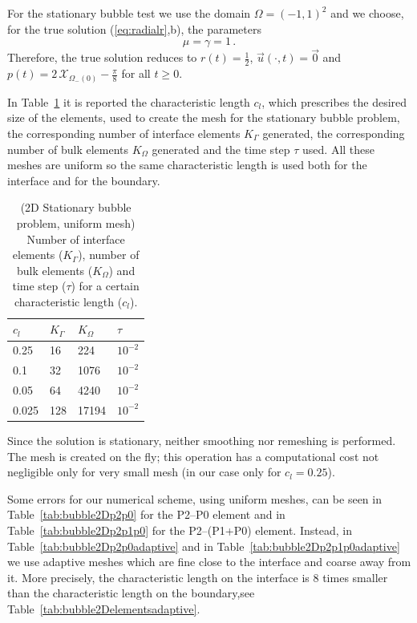 \documentclass[a4paper,12pt,onecolumn]{article}
\newcommand{\bigchi}{\ensuremath{\mathrm{\mathcal{X}}}}
\newcommand{\charfcn}[1]{\bigchi_{#1}} %
\begin{document}
For the stationary bubble test we use the domain $\Omega = (-1,1)^2$ and we choose, for the true solution (\ref{eq:radialr},b), the parameters
\begin{equation*}
\mu = \gamma = 1\,. 
\end{equation*}
Therefore, the true solution reduces to $r(t) = \frac{1}{2}$, $\vec u(\cdot, t) = \vec 0$ and $p(t) = 2\,\charfcn{\Omega_-(0)} - \frac{\pi}{8}$ for all $t \geq 0$.

In Table~\ref{tab:bubble2Delementsuniform} it is reported the characteristic length $c_l$, which prescribes the desired size of the elements, used to create the mesh for the stationary bubble problem, the corresponding number of interface elements $K_\Gamma$ generated, the corresponding number of bulk elements $K_\Omega$ generated and the time step $\tau$ used. All these meshes are uniform so the same characteristic length is used both for the interface and for the boundary. 
\begin{table}
 \center
\begin{tabular}{llll}
\hline
$c_l$ & $K_\Gamma$ & $K_\Omega$ & $\tau$ \\
\hline
0.25 & 16 & 224 & $10^{-2}$ \\
0.1 & 32 & 1076 & $10^{-2}$\\
0.05 & 64 & 4240 & $10^{-2}$\\
0.025 & 128 & 17194 & $10^{-2}$ \\
\hline
\end{tabular}
\caption{(2D Stationary bubble problem, uniform mesh) Number of interface elements ($K_\Gamma$), number of bulk elements ($K_\Omega$) and time step ($\tau$) for a certain characteristic length ($c_l$).}
\label{tab:bubble2Delementsuniform}
\end{table}

Since the solution is stationary, neither smoothing nor remeshing is performed. The mesh is created on the fly; this operation has a computational cost not negligible only for very small mesh (in our case only for $c_l=0.25$). 

Some errors for our numerical scheme, using uniform meshes, can be seen in Table~\ref{tab:bubble2Dp2p0} for the P2--P0 element and in Table~\ref{tab:bubble2Dp2p1p0} for the P2--(P1+P0) element. Instead, in Table~\ref{tab:bubble2Dp2p0adaptive} and in Table~\ref{tab:bubble2Dp2p1p0adaptive} we use adaptive meshes which are fine close to the interface and coarse away from it. More precisely, the characteristic length on the interface is 8 times smaller than the characteristic length on the boundary,see Table~\ref{tab:bubble2Delementsadaptive}. 
\newline
\end{document}
